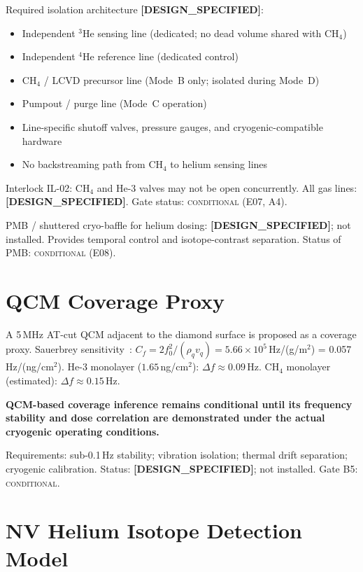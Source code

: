 \documentclass[12pt,a4paper]{article}
\newcommand{\conditional}{\textsc{conditional}}
\newcommand{\designspec}{\textbf{[DESIGN\_SPECIFIED]}}
\begin{document}
Required isolation architecture \designspec{}:
\begin{itemize}[noitemsep]
  \item Independent $^3$He sensing line (dedicated; no dead volume shared with CH$_4$)
  \item Independent $^4$He reference line (dedicated control)
  \item CH$_4$ / LCVD precursor line (Mode~B only; isolated during Mode~D)
  \item Pumpout / purge line (Mode~C operation)
  \item Line-specific shutoff valves, pressure gauges, and cryogenic-compatible hardware
  \item No backstreaming path from CH$_4$ to helium sensing lines
\end{itemize}

Interlock IL-02: CH$_4$ and He-3 valves may not be open concurrently.
All gas lines: \designspec{}. Gate status: \conditional{} (E07, A4).

PMB / shuttered cryo-baffle for helium dosing: \designspec{}; not installed.
Provides temporal control and isotope-contrast separation.
Status of PMB: \conditional{} (E08).

\section{QCM Coverage Proxy}
\label{sec:qcm}

A 5\,MHz AT-cut QCM adjacent to the diamond surface is proposed as a coverage proxy.
Sauerbrey sensitivity~\cite{Sauerbrey1959}:
$C_f = 2f_0^2/(\rho_q v_q) = 5.66\times10^5$\,Hz/(g/m$^2$) = 0.057\,Hz/(ng/cm$^2$).
He-3 monolayer ($1.65$\,ng/cm$^2$): $\Delta f \approx 0.09$\,Hz.
CH$_4$ monolayer (estimated): $\Delta f \approx 0.15$\,Hz.

\textbf{QCM-based coverage inference remains conditional until its frequency stability
and dose correlation are demonstrated under the actual cryogenic operating conditions.}

Requirements: sub-0.1\,Hz stability; vibration isolation; thermal drift separation;
cryogenic calibration.
Status: \designspec{}; not installed.
Gate B5: \conditional{}.

\section{NV Helium Isotope Detection Model}
\label{sec:detection}
\end{document}
